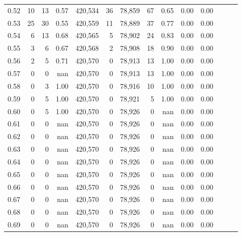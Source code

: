 \begin{tabular}{rrrrrrrrrrrrrr}
0.52 &      10 &     13 &  0.57 &  420,534 &       36 &  78,859 &      67 &  0.65 &  0.00 &      0.00 \\
0.53 &      25 &     30 &  0.55 &  420,559 &       11 &  78,889 &      37 &  0.77 &  0.00 &      0.00 \\
0.54 &       6 &     13 &  0.68 &  420,565 &        5 &  78,902 &      24 &  0.83 &  0.00 &      0.00 \\
0.55 &       3 &      6 &  0.67 &  420,568 &        2 &  78,908 &      18 &  0.90 &  0.00 &      0.00 \\
0.56 &       2 &      5 &  0.71 &  420,570 &        0 &  78,913 &      13 &  1.00 &  0.00 &      0.00 \\
0.57 &       0 &      0 &   nan &  420,570 &        0 &  78,913 &      13 &  1.00 &  0.00 &      0.00 \\
0.58 &       0 &      3 &  1.00 &  420,570 &        0 &  78,916 &      10 &  1.00 &  0.00 &      0.00 \\
0.59 &       0 &      5 &  1.00 &  420,570 &        0 &  78,921 &       5 &  1.00 &  0.00 &      0.00 \\
0.60 &       0 &      5 &  1.00 &  420,570 &        0 &  78,926 &       0 &   nan &  0.00 &      0.00 \\
0.61 &       0 &      0 &   nan &  420,570 &        0 &  78,926 &       0 &   nan &  0.00 &      0.00 \\
0.62 &       0 &      0 &   nan &  420,570 &        0 &  78,926 &       0 &   nan &  0.00 &      0.00 \\
0.63 &       0 &      0 &   nan &  420,570 &        0 &  78,926 &       0 &   nan &  0.00 &      0.00 \\
0.64 &       0 &      0 &   nan &  420,570 &        0 &  78,926 &       0 &   nan &  0.00 &      0.00 \\
0.65 &       0 &      0 &   nan &  420,570 &        0 &  78,926 &       0 &   nan &  0.00 &      0.00 \\
0.66 &       0 &      0 &   nan &  420,570 &        0 &  78,926 &       0 &   nan &  0.00 &      0.00 \\
0.67 &       0 &      0 &   nan &  420,570 &        0 &  78,926 &       0 &   nan &  0.00 &      0.00 \\
0.68 &       0 &      0 &   nan &  420,570 &        0 &  78,926 &       0 &   nan &  0.00 &      0.00 \\
0.69 &       0 &      0 &   nan &  420,570 &        0 &  78,926 &       0 &   nan &  0.00 &      0.00 \\

\end{tabular}
